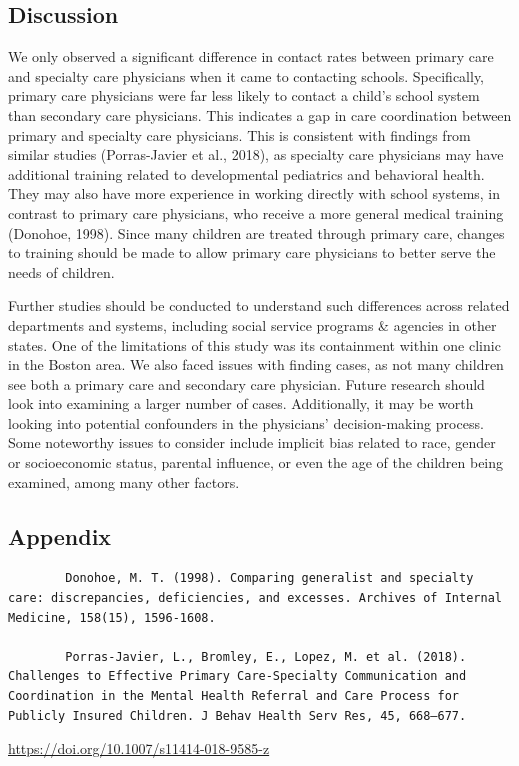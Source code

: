 \documentclass{article}
\begin{document}
	\subsection*{Discussion}
	We only observed a significant difference in contact rates between primary care and specialty care physicians when it came to contacting schools. Specifically, primary care physicians were far less likely to contact a child’s school system than secondary care physicians. This indicates a gap in care coordination between primary and specialty care physicians. This is consistent with findings from similar studies (Porras-Javier et al., 2018), as specialty care physicians may have additional training related to developmental pediatrics and behavioral health. They may also have more experience in working directly with school systems, in contrast to primary care physicians, who receive a more general medical training (Donohoe, 1998). Since many children are treated through primary care, changes to training should be made to allow primary care physicians to better serve the needs of children.

	Further studies should be conducted to understand such differences across related departments and systems, including social service programs \& agencies in other states. One of the limitations of this study was its containment within one clinic in the Boston area. We also faced issues with finding cases, as not many children see both a primary care and secondary care physician. Future research should look into examining a larger number of cases. Additionally, it may be worth looking into potential confounders in the physicians’ decision-making process. Some noteworthy issues to consider include implicit bias related to race, gender or socioeconomic status, parental influence, or even the age of the children being examined, among many other factors.

	\newpage
	\subsection*{Appendix}
	\begin{lstlisting}
		Donohoe, M. T. (1998). Comparing generalist and specialty care: discrepancies, deficiencies, and excesses. Archives of Internal Medicine, 158(15), 1596-1608.
		
		Porras-Javier, L., Bromley, E., Lopez, M. et al. (2018). Challenges to Effective Primary Care-Specialty Communication and Coordination in the Mental Health Referral and Care Process for Publicly Insured Children. J Behav Health Serv Res, 45, 668–677. 
		\end{lstlisting}
		
		\noindent\url{https://doi.org/10.1007/s11414-018-9585-z}
		




	
		
\end{document}
